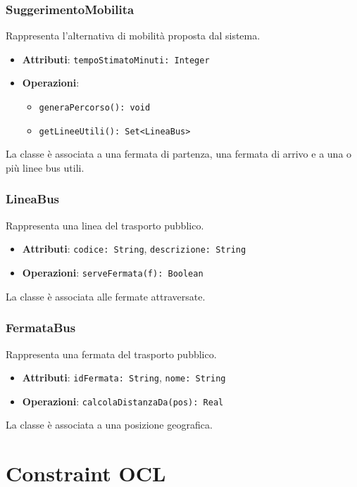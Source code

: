 \documentclass[12pt,a4paper]{article}
\begin{document}
\subsubsection{SuggerimentoMobilita}
Rappresenta l’alternativa di mobilità proposta dal sistema.

\begin{itemize}
    \item \textbf{Attributi}: \texttt{tempoStimatoMinuti: Integer}
    \item \textbf{Operazioni}:
    \begin{itemize}
        \item \texttt{generaPercorso(): void}
        \item \texttt{getLineeUtili(): Set<LineaBus>}
    \end{itemize}
\end{itemize}

La classe è associata a una fermata di partenza, una fermata di arrivo e a una o più linee bus utili.

\subsubsection{LineaBus}
Rappresenta una linea del trasporto pubblico.

\begin{itemize}
    \item \textbf{Attributi}: \texttt{codice: String}, \texttt{descrizione: String}
    \item \textbf{Operazioni}: \texttt{serveFermata(f): Boolean}
\end{itemize}

La classe è associata alle fermate attraversate.

\subsubsection{FermataBus}
Rappresenta una fermata del trasporto pubblico.

\begin{itemize}
    \item \textbf{Attributi}: \texttt{idFermata: String}, \texttt{nome: String}
    \item \textbf{Operazioni}: \texttt{calcolaDistanzaDa(pos): Real}
\end{itemize}

La classe è associata a una posizione geografica.

\section{Constraint OCL}
\end{document}
